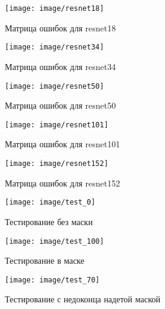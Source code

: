 \documentclass[a4paper,14pt]{article}
\begin{document}
\begin{figure}[H]
	\centering
	\texttt{[image: image/resnet18]}
	\caption{Матрица ошибок для resnet18}
	\label{fig:resnet18}
\end{figure}

\begin{figure}[H]
	\centering
	\texttt{[image: image/resnet34]}
	\caption{Матрица ошибок для resnet34}
	\label{fig:resnet34}
\end{figure}

\begin{figure}[H]
	\centering
	\texttt{[image: image/resnet50]}
	\caption{Матрица ошибок для resnet50}
	\label{fig:resnet50}
\end{figure}

\begin{figure}[H]
	\centering
	\texttt{[image: image/resnet101]}
	\caption{Матрица ошибок для resnet101}
	\label{fig:resnet101}
\end{figure}

\begin{figure}[H]
	\centering
	\texttt{[image: image/resnet152]}
	\caption{Матрица ошибок для resnet152}
	\label{fig:resnet152}
\end{figure}

\begin{figure}[H]
	\centering
	\texttt{[image: image/test\_0]}
	\caption{Тестирование без маски}
	\label{fig:test0}
\end{figure}

\begin{figure}[H]
	\centering
	\texttt{[image: image/test\_100]}
	\caption{Тестирование в маске}
	\label{fig:test100}
\end{figure}

\begin{figure}[H]
	\centering
	\texttt{[image: image/test\_70]}
	\caption{Тестирование с недоконца надетой маской}
	\label{fig:test70}
\end{figure}


\end{document}
